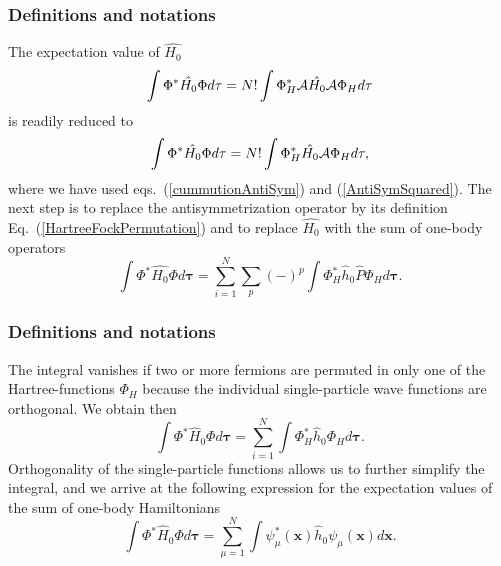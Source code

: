\documentclass[compress]{beamer}
\begin{document}
\frame
{
  \frametitle{Definitions and notations}
\begin{small}
{\scriptsize
The expectation value of $\hat{H_0}$ 
\[
  \int \Phi^*\hat{H_0}\Phi d\mathbf{\tau} 
  = N! \int \Phi_H^*{\cal A}\hat{H_0}{\cal A}\Phi_H d\mathbf{\tau}
\]
is readily reduced to
\[
  \int \Phi^*\hat{H_0}\Phi d\mathbf{\tau} 
  = N! \int \Phi_H^*\hat{H_0}{\cal A}\Phi_H d\mathbf{\tau},
\]
where we have used eqs.~(\ref{cummutionAntiSym}) and
(\ref{AntiSymSquared}). The next step is to replace the antisymmetrization
operator by its definition Eq.~(\ref{HartreeFockPermutation}) and to
replace $\hat{H_0}$ with the sum of one-body operators
\[
  \int \Phi^*\hat{H_0}\Phi  d\mathbf{\tau}
  = \sum_{i=1}^N \sum_{p} (-)^p\int 
  \Phi_H^*\hat{h}_0\hat{P}\Phi_H d\mathbf{\tau}.
\]

}
\end{small}
}

\frame
{
  \frametitle{Definitions and notations}
\begin{small}
{\scriptsize
The integral vanishes if two or more fermions are permuted in only one
of the Hartree-functions $\Phi_H$ because the individual single-particle wave functions are
orthogonal. We obtain then
\[
  \int \Phi^*\hat{H}_0\Phi  d\mathbf{\tau}= \sum_{i=1}^N \int \Phi_H^*\hat{h}_0\Phi_H  d\mathbf{\tau}.
\]
Orthogonality of the single-particle functions allows us to further simplify the integral, and we
arrive at the following expression for the expectation values of the
sum of one-body Hamiltonians 
\begin{equation}
  \int \Phi^*\hat{H}_0\Phi  d\mathbf{\tau}
  = \sum_{\mu=1}^N \int \psi_{\mu}^*(\mathbf{x})\hat{h}_0\psi_{\mu}(\mathbf{x})
  d\mathbf{x}.
  \label{H1Expectation}
\end{equation}

}
\end{small}
}
\end{document}
